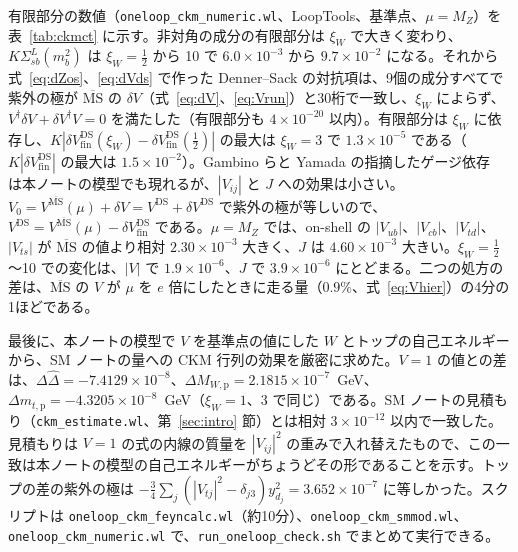 \documentclass[a4paper,10pt]{ltjsarticle}
\newcommand{\MSbar}{\overline{\mathrm{MS}}}
\begin{document}
有限部分の数値（\texttt{oneloop\_ckm\_numeric.wl}、LoopTools、基準点、$\mu=M_Z$）を表~\ref{tab:ckmct} に示す。非対角の成分の有限部分は $\xi_W$ で大きく変わり、$K\Sigma^L_{sb}(m_b^2)$ は $\xi_W=\frac12$ から 10 で $6.0\times10^{-3}$ から $9.7\times10^{-2}$ になる。それから式~\eqref{eq:dZos}、\eqref{eq:dVds} で作った Denner--Sack の対抗項は、9個の成分すべてで紫外の極が $\MSbar$ の $\delta V$（式~\eqref{eq:dV}、\eqref{eq:Vrun}）と30桁で一致し、$\xi_W$ によらず、$V^\dagger\delta V+\delta V^\dagger V=0$ を満たした（有限部分も $4\times10^{-20}$ 以内）。有限部分は $\xi_W$ に依存し、$K|\delta V^{\mathrm{DS}}_{\mathrm{fin}}(\xi_W)-\delta V^{\mathrm{DS}}_{\mathrm{fin}}(\frac12)|$ の最大は $\xi_W=3$ で $1.3\times10^{-5}$ である（$K|\delta V^{\mathrm{DS}}_{\mathrm{fin}}|$ の最大は $1.5\times10^{-2}$）。Gambino らと Yamada の指摘したゲージ依存~\cite{ggm99,yamada01} は本ノートの模型でも現れるが、$|V_{ij}|$ と $J$ への効果は小さい。$V_0=V^{\MSbar}(\mu)+\delta V=V^{\mathrm{DS}}+\delta V^{\mathrm{DS}}$ で紫外の極が等しいので、$V^{\mathrm{DS}}=V^{\MSbar}(\mu)-\delta V^{\mathrm{DS}}_{\mathrm{fin}}$ である。$\mu=M_Z$ では、on-shell の $|V_{ub}|$、$|V_{cb}|$、$|V_{td}|$、$|V_{ts}|$ が $\MSbar$ の値より相対 $2.30\times10^{-3}$ 大きく、$J$ は $4.60\times10^{-3}$ 大きい。$\xi_W=\frac12$〜10 での変化は、$|V|$ で $1.9\times10^{-6}$、$J$ で $3.9\times10^{-6}$ にとどまる。二つの処方の差は、$\MSbar$ の $V$ が $\mu$ を $e$ 倍にしたときに走る量（$0.9\%$、式~\eqref{eq:Vhier}）の4分の1ほどである。

最後に、本ノートの模型で $V$ を基準点の値にした $W$ とトップの自己エネルギーから、SM ノートの量への CKM 行列の効果を厳密に求めた。$V=1$ の値との差は、$\Delta\hat\Delta=-7.4129\times10^{-8}$、$\Delta M_{W,\mathrm p}=2.1815\times10^{-7}$~GeV、$\Delta m_{t,\mathrm p}=-4.3205\times10^{-8}$~GeV（$\xi_W=1$、3 で同じ）である。SM ノートの見積もり（\texttt{ckm\_estimate.wl}、第~\ref{sec:intro} 節）とは相対 $3\times10^{-12}$ 以内で一致した。見積もりは $V=1$ の式の内線の質量を $|V_{ij}|^2$ の重みで入れ替えたもので、この一致は本ノートの模型の自己エネルギーがちょうどその形であることを示す。トップの差の紫外の極は $-\frac34\sum_j(|V_{tj}|^2-\delta_{j3})y_{d_j}^2=3.652\times10^{-7}$ に等しかった。スクリプトは \texttt{oneloop\_ckm\_feyncalc.wl}（約10分）、\texttt{oneloop\_ckm\_smmod.wl}、\texttt{oneloop\_ckm\_numeric.wl} で、\texttt{run\_oneloop\_check.sh} でまとめて実行できる。
\end{document}
